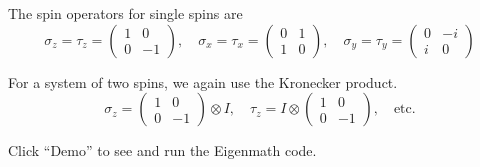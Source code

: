 \documentclass[12pt]{article}
\begin{document}
The spin operators for single spins are
\begin{equation*}
\sigma_z=\tau_z=\begin{pmatrix}1&0\\0&-1\end{pmatrix},
\quad
\sigma_x=\tau_x=\begin{pmatrix}0&1\\1&0\end{pmatrix},
\quad
\sigma_y=\tau_y=\begin{pmatrix}0&-i\\i&0\end{pmatrix}
\end{equation*}

For a system of two spins, we again use the Kronecker product.
\begin{equation*}
\sigma_z=\begin{pmatrix}1&0\\0&-1\end{pmatrix}\otimes I,
\quad
\tau_z=I\otimes\begin{pmatrix}1&0\\0&-1\end{pmatrix},
\quad
\text{etc.}
\end{equation*}

Click ``Demo'' to see and run the Eigenmath code.
\end{document}
